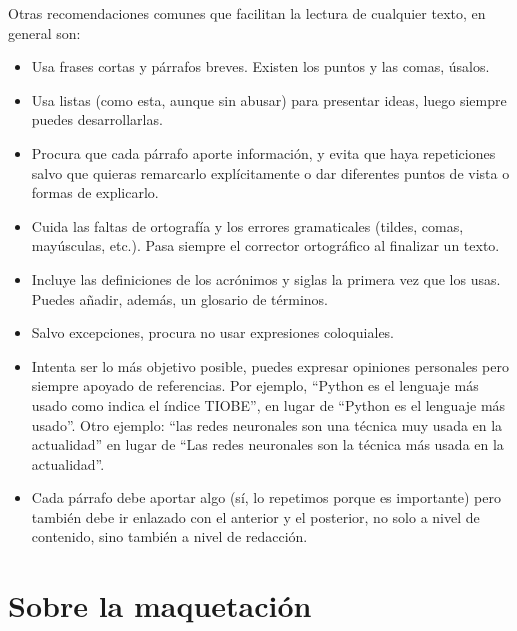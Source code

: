 Otras recomendaciones comunes que facilitan la lectura de cualquier texto, en general son:
\begin{itemize}
    \item Usa frases cortas y párrafos breves. Existen los puntos y las comas, úsalos.
    \item Usa listas (como esta, aunque sin abusar) para presentar ideas, luego siempre puedes desarrollarlas.
    \item Procura que cada párrafo aporte información, y evita que haya repeticiones salvo que quieras remarcarlo explícitamente o dar diferentes puntos de vista o formas de explicarlo.  
    \item Cuida las faltas de ortografía y los errores gramaticales (tildes, comas, mayúsculas, etc.). Pasa siempre el corrector ortográfico al finalizar un texto.
    \item Incluye las definiciones de los acrónimos y siglas la primera vez que los usas. Puedes añadir, además, un glosario de términos.
    \item Salvo excepciones, procura no usar expresiones coloquiales.
    \item Intenta ser lo más objetivo posible, puedes expresar opiniones personales pero siempre apoyado de referencias. Por ejemplo, ``Python es el lenguaje más usado como indica el índice TIOBE'', en lugar de ``Python es el lenguaje más usado''. Otro ejemplo: ``las redes neuronales son una técnica muy usada en la actualidad'' en lugar de ``Las redes neuronales son la técnica más usada en la actualidad''.
    \item Cada párrafo debe aportar algo (sí, lo repetimos porque es importante) pero también debe ir enlazado con el anterior y el posterior, no solo a nivel de contenido, sino también a nivel de redacción.
\end{itemize}



\section{Sobre la maquetación}  %



